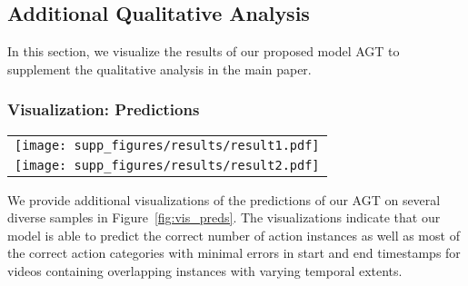 \documentclass[10pt,twocolumn,letterpaper]{article}
\begin{document}
\subsection{Additional Qualitative Analysis}
In this section, we visualize the results of our proposed model AGT to supplement the qualitative analysis in the main paper.

\subsubsection{Visualization: Predictions}
\label{subsec:vis_preds}
\begin{figure*}
\centering
    \begin{tabular}{c}
    \texttt{[image: supp\_figures/results/result1.pdf]}
    \\
    \texttt{[image: supp\_figures/results/result2.pdf]}
    \end{tabular}
    \caption{\textbf{Visualization: Predictions. } Visualization of predictions and groundtruth action instances}
    \label{fig:vis_preds}
\end{figure*} We provide additional visualizations of the predictions of our AGT on several diverse samples in Figure~\ref{fig:vis_preds}. The visualizations indicate that our model is able to predict the correct number of action instances as well as most of the correct action categories with minimal errors in start and end timestamps for videos containing overlapping instances with varying temporal extents. 
\end{document}
